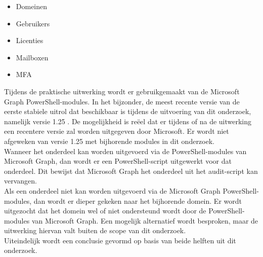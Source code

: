 \begin{itemize}
    \item Domeinen
    \item Gebruikers
    \item Licenties
    \item Mailboxen
    \item \ac{MFA}
\end{itemize}

Tijdens de praktische uitwerking wordt er gebruikgemaakt van de Microsoft Graph PowerShell-modules. In het bijzonder, de meest recente versie van de eerste stabiele uitrol dat beschikbaar is tijdens de uitvoering van dit onderzoek, namelijk versie 1.25 \autocite{Microsoft2023k}. De mogelijkheid is reëel dat er tijdens of na de uitwerking een recentere versie zal worden uitgegeven door Microsoft. Er wordt niet afgeweken van versie 1.25 met bijhorende modules in dit onderzoek. \\  

Wanneer het onderdeel kan worden uitgevoerd via de PowerShell-modules van Microsoft Graph, dan wordt er een PowerShell-script uitgewerkt voor dat onderdeel. Dit bewijst dat Microsoft Graph het onderdeel uit het audit-script kan vervangen. \\

Als een onderdeel niet kan worden uitgevoerd via de Microsoft Graph PowerShell-modules, dan wordt er dieper gekeken naar het bijhorende domein. Er wordt uitgezocht dat het domein wel of niet ondersteund wordt door de PowerShell-modules van Microsoft Graph. Een mogelijk alternatief wordt besproken, maar de uitwerking hiervan valt buiten de scope van dit onderzoek. \\

Uiteindelijk wordt een conclusie gevormd op basis van beide helften uit dit onderzoek. 

